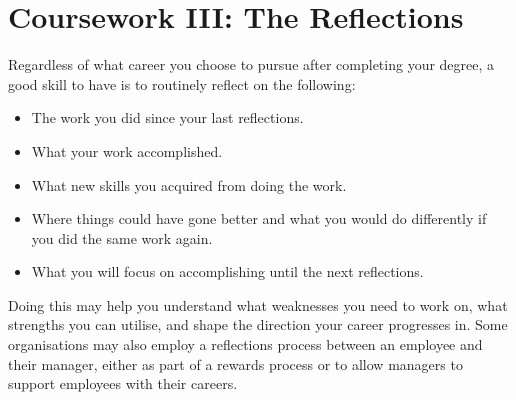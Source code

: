 
\clearpage
\section{Coursework III: The Reflections}

Regardless of what career you choose to pursue after completing your degree, a good skill to have is to routinely reflect on the following:

\begin{itemize}
    \item The work you did since your last reflections.
    \item What your work accomplished.
    \item What new skills you acquired from doing the work.
    \item Where things could have gone better and what you would do differently if you did the same work again.
    \item What you will focus on accomplishing until the next reflections.
\end{itemize}

Doing this may help you understand what weaknesses you need to work on, what strengths you can utilise, and shape the direction your career progresses in. Some organisations may also employ a reflections process between an employee and their manager, either as part of a rewards process or to allow managers to support employees with their careers.
